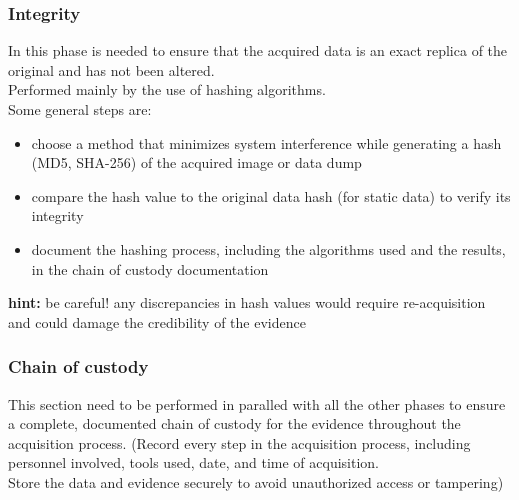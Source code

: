 \subsubsection{Integrity}
In this phase is needed to ensure that the acquired data is an exact replica of the original and has not been altered. \\ Performed mainly by the use of hashing algorithms. \\ Some general steps are:
\begin{itemize}[itemsep=0pt]
  \item choose a method that minimizes system interference while generating a hash (MD5, SHA-256) of the acquired image or data dump
  \item compare the hash value to the original data hash (for static data) to verify its integrity
  \item document the hashing process, including the algorithms used and the results, in the chain of custody documentation
\end{itemize}
\textbf{hint:} be careful! any discrepancies in hash values would require re-acquisition and could damage the credibility of the evidence

\subsubsection{Chain of custody}
This section need to be performed in paralled with all the other phases to ensure a complete, documented chain of custody for the evidence throughout the acquisition process. (Record every step in the acquisition process, including personnel involved, tools used, date, and time of acquisition. \\ Store the data and evidence securely to avoid unauthorized access or tampering)

